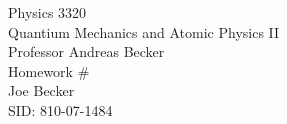 \begin{titlepage}
\setlength{\topmargin}{1.5in}
\begin{center}
\Huge{Physics 3320} \\
\LARGE{Quantium Mechanics and Atomic Physics II} \\
\Large{Professor Andreas Becker} \\[1cm]

\huge{Homework \#\HWnum}\\[0.5cm]

\large{Joe Becker} \\
\large{SID: 810-07-1484} \\
\large{\due} 

\end{center}

\end{titlepage}

